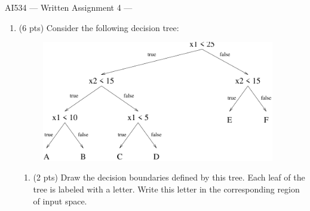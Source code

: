 \documentclass{article}
\def\centerps#1{\begin{center}
\leavevmode
\epsfbox{#1}
\end{center}}
\begin{document}
{\Large
\begin{center}
AI534 --- Written Assignment 4 ---
\end{center}
}
\begin{enumerate}
\item (6 pts) Consider the following decision tree:\\
\begin{figure}[h]
\begin{center}
\includegraphics[width=4in]{tree1.pdf}
\end{center}
\end{figure}

\begin{enumerate}

\item (2 pts) Draw the decision boundaries defined by this tree. Each
leaf of the tree is labeled with a letter.  Write this
letter in the corresponding region of input space.\\

\end{enumerate}
\end{enumerate}
\end{document}

